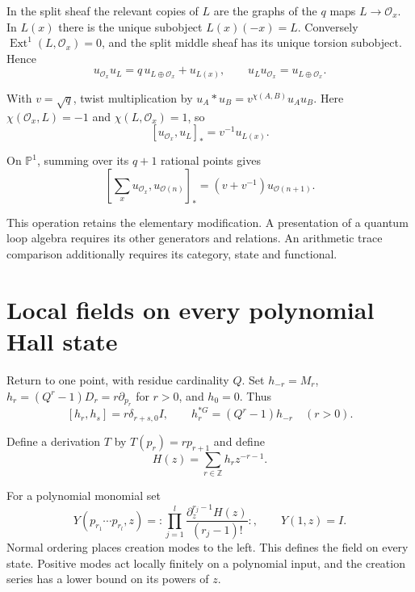 In the split sheaf the relevant copies of $L$ are the graphs of the
$q$ maps $L\to\mathcal O_x$. In $L(x)$ there is the unique
subobject $L(x)(-x)=L$. Conversely
$\operatorname{Ext}^1(L,\mathcal O_x)=0$, and the split middle
sheaf has its unique torsion subobject. Hence
\[
 u_{\mathcal O_x}u_L=q\,u_{L\oplus\mathcal O_x}+u_{L(x)},
 \qquad u_Lu_{\mathcal O_x}=u_{L\oplus\mathcal O_x}.
\]

With $v=\sqrt q$, twist multiplication by
$u_A*u_B=v^{\chi(A,B)}u_Au_B$.
Here $\chi(\mathcal O_x,L)=-1$ and $\chi(L,\mathcal O_x)=1$, so
\[
 [u_{\mathcal O_x},u_L]_* =v^{-1}u_{L(x)}.
\]

On $\mathbb P^1$, summing over its $q+1$ rational points gives
\[
 \left[\sum_xu_{\mathcal O_x},u_{\mathcal O(n)}\right]_*
 =(v+v^{-1})u_{\mathcal O(n+1)}.
\]

This operation retains the elementary modification. A presentation
of a quantum loop algebra requires its other generators and relations.
An arithmetic trace comparison additionally requires its category,
state and functional.

\section{Local fields on every polynomial Hall state}
\label{v4-arith:curve:sec:local-fields}

Return to one point, with residue cardinality $Q$.
Set $h_{-r}=M_r$, $h_r=(Q^r-1)D_r=r\partial_{p_r}$ for $r>0$,
and $h_0=0$. Thus
\[
 [h_r,h_s]=r\delta_{r+s,0}I,
 \qquad h_r^{*G}=(Q^r-1)h_{-r}\quad(r>0).
\]

Define a derivation $T$ by $T(p_r)=rp_{r+1}$ and define
\[
 H(z)=\sum_{r\in\mathbb Z}h_rz^{-r-1}.
\]

For a polynomial monomial set
\begin{equation}\label{v4-arith:curve:eq:all-states}
 Y(p_{r_1}\cdots p_{r_l},z)
 =:\prod_{j=1}^l\frac{\partial_z^{r_j-1}H(z)}{(r_j-1)!}:,
 \qquad Y(1,z)=I.
\end{equation}
Normal ordering places creation modes to the left. This defines
the field on every state. Positive modes act locally finitely on
a polynomial input, and the creation series has a lower bound on
its powers of $z$.

